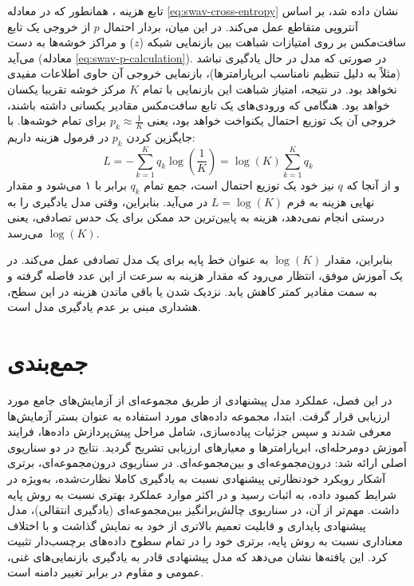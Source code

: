 تابع هزینه ، همانطور که در معادله \ref{eq:swav-cross-entropy} نشان داده شد، بر اساس آنتروپی متقاطع عمل می‌کند. در این میان، بردار احتمال $p$ از خروجی یک تابع سافت‌مکس بر روی امتیازات شباهت بین بازنمایی شبکه ($z$) و مراکز خوشه‌ها به دست می‌آید (معادله \ref{eq:swav-p-calculation}). در صورتی که مدل در حال یادگیری نباشد (مثلاً به دلیل تنظیم نامناسب ابرپارامترها)، بازنمایی خروجی آن حاوی اطلاعات مفیدی نخواهد بود. در نتیجه، امتیاز شباهت این بازنمایی با تمام $K$
مرکز خوشه تقریبا یکسان خواهد بود. هنگامی که ورودی‌های یک تابع سافت‌مکس مقادیر یکسانی داشته باشند، خروجی آن یک توزیع احتمال یکنواخت خواهد بود، یعنی $p_k \approx \frac{1}{K}$ برای تمام خوشه‌ها. با جایگزین کردن $p_k$ در فرمول هزینه داریم:
\begin{equation}
    L = - \sum_{k=1}^{K} q_k \log \left( \frac{1}{K} \right) = \log(K) \sum_{k=1}^{K} q_k
\end{equation}
و از آنجا که $q$ نیز خود یک توزیع احتمال است، جمع تمام $q_k$ برابر با ۱ می‌شود و مقدار نهایی هزینه به فرم $L = \log(K)$ در می‌آید. بنابراین، وقتی مدل یادگیری را به درستی انجام نمی‌دهد، هزینه به پایین‌ترین حد ممکن برای یک حدس تصادفی، یعنی 
$\log(K)$ می‌رسد.

بنابراین، مقدار $\log(K)$ به عنوان خط پایه برای یک مدل تصادفی عمل می‌کند. در یک آموزش موفق، انتظار می‌رود که مقدار هزینه به سرعت از این عدد فاصله گرفته و به سمت مقادیر کمتر کاهش یابد. نزدیک شدن یا باقی ماندن هزینه در این سطح، هشداری مبنی بر عدم یادگیری مدل است.

\section{جمع‌بندی}

در این فصل، عملکرد مدل پیشنهادی از طریق مجموعه‌ای از آزمایش‌های جامع مورد ارزیابی قرار گرفت. ابتدا، مجموعه داده‌های مورد استفاده به عنوان بستر آزمایش‌ها معرفی شدند و سپس جزئیات پیاده‌سازی، شامل مراحل پیش‌پردازش داده‌ها، فرایند آموزش دومرحله‌ای، ابرپارامترها و معیارهای ارزیابی تشریح گردید. نتایج در دو سناریوی اصلی ارائه شد: درون‌مجموعه‌ای و بین‌مجموعه‌ای. در سناریوی درون‌مجموعه‌ای، برتری آشکار رویکرد خودنظارتی پیشنهادی نسبت به یادگیری کاملا نظارت‌شده، به‌ویژه در شرایط کمبود داده، به اثبات رسید و در اکثر موارد عملکرد بهتری نسبت به روش پایه داشت. مهم‌تر از آن، در سناریوی چالش‌برانگیز بین‌مجموعه‌ای (یادگیری انتقالی)، مدل پیشنهادی پایداری و قابلیت تعمیم بالاتری از خود به نمایش گذاشت و با اختلاف معناداری نسبت به روش پایه، برتری خود را در تمام سطوح داده‌های برچسب‌دار تثبیت کرد. این یافته‌ها نشان می‌دهد که مدل پیشنهادی قادر به یادگیری بازنمایی‌های غنی، عمومی و مقاوم در برابر تغییر دامنه است.
